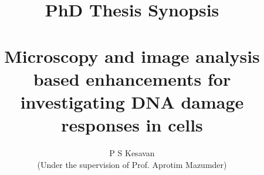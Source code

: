 \usepackage{titling}
\renewcommand\maketitlehooka{\null\mbox{}\vfill}
\renewcommand\maketitlehookd{\vfill\null}
\begin{titlepage}
\title{{PhD Thesis Synopsis}\\{\vspace{-0.29em} \hrulefill\\} \textbf{Microscopy and image analysis based enhancements for investigating DNA damage responses in cells}}
\author{P S Kesavan\\ {\vspace{6em}(Under the supervision of Prof. Aprotim Mazumder)}}
\date{}
\end{titlepage}

